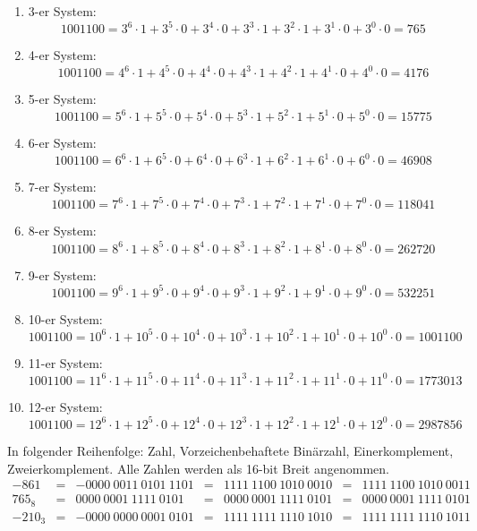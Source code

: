 \documentclass[DIN, pagenumber=false, fontsize=11pt, parskip=half]{scrartcl}
\newcommand{\bullshit}[2]{#1-er System:
            \begin{equation*}
                1001100 = #1^6 \cdot 1 + #1^5 \cdot 0 + #1^4 \cdot 0 + #1^3 \cdot 1 + #1^2 \cdot 1 +  #1^1 \cdot 0 + #1^0 \cdot  0 = #2
            \end{equation*}
            }
\begin{document}
    \begin{enumerate}
        \item \bullshit{3}{765}
        \item \bullshit{4}{4176}
        \item \bullshit{5}{15775}
        \item \bullshit{6}{46908}
        \item \bullshit{7}{118041}
        \item \bullshit{8}{262720}
        \item \bullshit{9}{532251}
        \item \bullshit{10}{1001100}
        \item \bullshit{11}{1773013}
        \item \bullshit{12}{2987856}
    \end{enumerate}
    In folgender Reihenfolge: Zahl, Vorzeichenbehaftete Binärzahl, Einerkomplement, Zweierkomplement. Alle Zahlen werden als 16-bit Breit angenommen.
    \begin{align*}
        -861 &=& -0000\ 0011\ 0101\ 1101 &=& 1111\ 1100\ 1010\ 0010 &=& 1111\ 1100\ 1010\ 0011\\
        {765}_8 &=& 0000\ 0001\ 1111\ 0101 &=& 0000\ 0001\ 1111\ 0101 &=& 0000\ 0001\ 1111\ 0101 \\ 
        -{210}_3 &=&- 0000\ 0000\ 0001\ 0101 &=& 1111\ 1111\ 1110\ 1010 &=& 1111\ 1111\ 1110\ 1011
    \end{align*}
    
\end{document}
